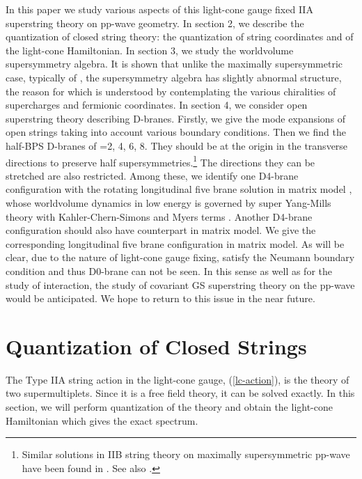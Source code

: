 \documentclass[a4paper,12pt]{article}
\begin{document}
In this paper we study various aspects of this light-cone gauge fixed
IIA superstring theory on pp-wave geometry.  In section 2, we describe
the quantization of closed string theory: the quantization of string
coordinates and of the light-cone Hamiltonian.  In section 3, we study
the worldvolume supersymmetry algebra.  It is shown that unlike the
maximally supersymmetric case, typically of \cite{met044}, the
supersymmetry algebra has slightly abnormal structure, the reason for
which is understood by contemplating the various chiralities of
supercharges and fermionic coordinates.  In section 4, we consider
open superstring theory describing D-branes. Firstly, we give the mode
expansions of open strings taking into account various boundary
conditions.  Then we find the half-BPS D\coordHE{}-branes of \coordHE{}=2, 4, 6,
8. They should be at the origin in the transverse directions to
preserve half supersymmetries.\footnote{Similar solutions in IIB
string theory on maximally supersymmetric pp-wave have been found in
\cite{dab231,ske054,bil028,bai038}. See also \cite{kum025,ali134}.}
The directions they can be stretched are also restricted.  Among
these, we identify one D4-brane configuration with the rotating
longitudinal five brane solution in matrix model \cite{hyu090}, whose
worldvolume dynamics in low energy is governed by super Yang-Mills
theory with Kahler-Chern-Simons and Myers terms \cite{hyu219}. Another
D4-brane configuration should also have counterpart in matrix
model. We give the corresponding longitudinal five brane configuration
in matrix model.  As will be clear, due to the nature of light-cone
gauge fixing, \coordHE{} satisfy the Neumann boundary condition and
thus D0-brane can not be seen.  In this sense as well as for the study
of interaction, the study of covariant GS superstring theory on the
pp-wave would be anticipated. We hope to return to this issue in the
near future.




\section{Quantization of Closed Strings}

The Type IIA string action in the light-cone gauge, (\ref{lc-action}),
is the theory of two \coordHE{} supermultiplets.  Since it is a free
field theory, it can be solved exactly.  In this section, we will
perform quantization of the theory and obtain the light-cone
Hamiltonian which gives the exact spectrum.
\end{document}
